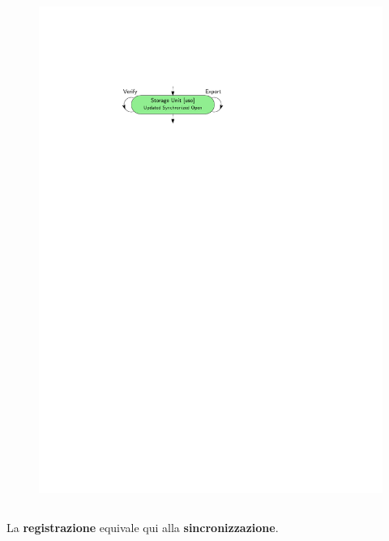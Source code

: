 \documentclass{beamer}
\begin{document}
\begin{frame}[fragile]
\begin{columns}
\begin{figure}
			\includegraphics[width=\textwidth]{figures/uso.pdf}
			\bigskip
		\end{figure}
	\end{columns}
	\vspace{-0.6cm}
	\hspace{-0.4cm}
	{\scriptsize La \textbf{registrazione} equivale qui alla \textbf{sincronizzazione}.}
\end{frame}
\end{document}
